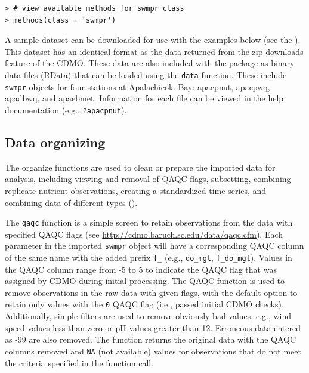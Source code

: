 \documentclass[10pt,letterpaper]{article}\usepackage[]{graphicx}\usepackage[]{color}
\makeatletter
\newenvironment{kframe}{%
 \def\at@end@of@kframe{}%
 \ifinner\ifhmode%
  \def\at@end@of@kframe{\end{minipage}}%
  \begin{minipage}{\columnwidth}%
 \fi\fi%
 \def\FrameCommand##1{\hskip\@totalleftmargin \hskip-\fboxsep
 \colorbox{shadecolor}{##1}\hskip-\fboxsep
     \hskip-\linewidth \hskip-\@totalleftmargin \hskip\columnwidth}%
 \MakeFramed {\advance\hsize-\width
   \@totalleftmargin\z@ \linewidth\hsize
   \@setminipage}}%
 {\par\unskip\endMakeFramed%
 \at@end@of@kframe}
\newenvironment{knitrout}{}{} %
\makeatother
\begin{document}
\begin{knitrout}\small
{}\color{fgcolor}\begin{kframe}
\begin{verbatim}
> # view available methods for swmpr class
> methods(class = 'swmpr')
\end{verbatim}
\end{kframe}
\end{knitrout}

A sample dataset can be downloaded for use with the examples below (see the ).  This dataset has an identical format as the data returned from the zip downloads feature of the \gls{CDMO}.  These data are also included with the package as binary data files (RData) that can be loaded using the \texttt{data} function.  These include \texttt{swmpr} objects for four stations at Apalachicola Bay: apacpnut, apacpwq, apadbwq, and apaebmet.  Information for each file can be viewed in the help documentation (e.g., \texttt{?apacpnut}).

\subsection*{Data organizing}

The organize functions are used to clean or prepare the imported data for analysis, including viewing and removal of QAQC flags, subsetting, combining replicate nutrient observations, creating a standardized time series, and combining data of different types ().

The \texttt{qaqc} function is a simple screen to retain observations from the data with specified QAQC flags (see \url{http://cdmo.baruch.sc.edu/data/qaqc.cfm}). Each parameter in the imported \texttt{swmpr} object will have a corresponding QAQC column of the same name with the added prefix \texttt{f\_} (e.g., \texttt{do\_mgl}, \texttt{f\_do\_mgl}).  Values in the QAQC column range from -5 to 5 to indicate the \gls{QAQC} flag that was assigned by \gls{CDMO} during initial processing.  The \gls{QAQC} function is used to remove observations in the raw data with given flags, with the default option to retain only values with the \texttt{0} \gls{QAQC} flag (i.e., passed initial \gls{CDMO} checks).     Additionally, simple filters are used to remove obviously bad values, e.g., wind speed values less than zero or pH values greater than 12. Erroneous data entered as -99 are also removed. The function returns the original data with the QAQC columns removed and \texttt{NA} (not available) values for observations that do not meet the criteria specified in the function call.
\end{document}
